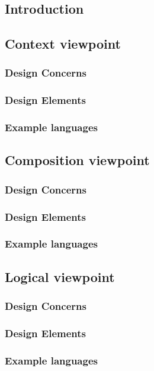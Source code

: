 \documentclass[onecolumn, draftclsnofoot,10pt, compsoc]{IEEEtran}
\begin{document}
\begin{singlespace}
	\subsection{Introduction}
	\subsection{Context viewpoint}
		\subsubsection{Design Concerns}
		\subsubsection{Design Elements}
		\subsubsection{Example languages}
	\subsection{Composition viewpoint}
		\subsubsection{Design Concerns}
		\subsubsection{Design Elements}
		\subsubsection{Example languages}
	\subsection{Logical viewpoint}
		\subsubsection{Design Concerns}
		\subsubsection{Design Elements}
		\subsubsection{Example languages}

\end{singlespace}
\end{document}
